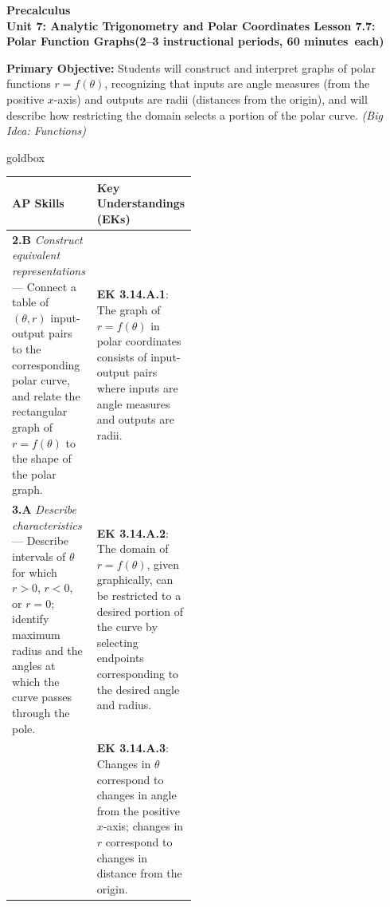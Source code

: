 \documentclass[10pt]{article}
\newcommand{\CourseName}{Precalculus}
\newcommand{\MeetingLength}{60 minutes}
\newcommand{\UnitNumberName}{Unit 7: Analytic Trigonometry and Polar Coordinates \quad}
\newcommand{\LessonNumberName}{Lesson 7.7: Polar Function Graphs}
\begin{document}
\begin{center}
  {\Large\bfseries \CourseName} \\[4pt]
  {\small\bfseries \UnitNumberName \LessonNumberName \quad (2--3 instructional periods, \MeetingLength\ each)}
\end{center}

\begin{tcolorbox}[colback=sky, colframe=navy, boxrule=0.9pt, arc=2mm,
    left=2mm, right=2mm, top=1.5mm, bottom=1.5mm]
  \textbf{Primary Objective:} Students will construct and interpret graphs of polar
  functions $r = f(\theta)$, recognizing that inputs are angle measures (from the
  positive $x$-axis) and outputs are radii (distances from the origin), and will
  describe how restricting the domain selects a portion of the polar curve.
  \textit{(Big Idea: Functions)}
\end{tcolorbox}

\vspace{0.08in}

\begin{skillbox}{goldbox}
\begin{tabularx}{\linewidth}{@{} p{0.46\linewidth} X @{}}
\textbf{AP Skills} & \textbf{Key Understandings (EKs)} \\
\midrule
\textbf{2.B} \textit{Construct equivalent representations} ---
  Connect a table of $(\theta, r)$ input-output pairs to the corresponding
  polar curve, and relate the rectangular graph of $r = f(\theta)$ to the
  shape of the polar graph.
&
\textbf{EK 3.14.A.1}: The graph of $r = f(\theta)$ in polar coordinates
consists of input-output pairs where inputs are angle measures and outputs
are radii. \\[4pt]

\textbf{3.A} \textit{Describe characteristics} ---
  Describe intervals of $\theta$ for which $r > 0$, $r < 0$, or $r = 0$;
  identify maximum radius and the angles at which the curve passes through
  the pole.
&
\textbf{EK 3.14.A.2}: The domain of $r = f(\theta)$, given graphically,
can be restricted to a desired portion of the curve by selecting endpoints
corresponding to the desired angle and radius. \\[4pt]

&
\textbf{EK 3.14.A.3}: Changes in $\theta$ correspond to changes in angle
from the positive $x$-axis; changes in $r$ correspond to changes in distance
from the origin. \\
\end{tabularx}
\end{skillbox}
\end{document}
